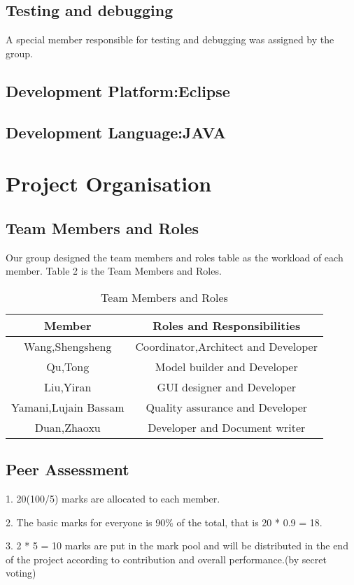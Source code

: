 \documentclass[12pt]{amsart}
\begin{document}
\subsection{Testing and debugging}
A special member responsible for testing and debugging was assigned by the group.

\subsection{Development Platform:Eclipse}
\subsection{Development Language:JAVA}

\section{\textbf{Project Organisation}}
\subsection{\textbf{Team Members and Roles}}
Our group designed the team members and roles table as the workload of each member. Table 2 is the Team Members and Roles.
\begin{table}[h]
\begin{tabular}{ | c | c | }
\hline
Member &  Roles and Responsibilities\\
\hline
Wang,Shengsheng & Coordinator,Architect and Developer\\
\hline
Qu,Tong & Model builder and Developer\\
\hline
Liu,Yiran & GUI designer and Developer\\
\hline
Yamani,Lujain Bassam & Quality assurance and Developer\\
\hline
Duan,Zhaoxu & Developer and Document writer\\
\hline
\end{tabular}
\caption{Team Members and Roles}
\end{table}
\subsection{\textbf{Peer Assessment}}

1. 20(100/5) marks are allocated to each member.

2. The basic marks for everyone is 90$\%$ of the total, that is 20 * 0.9 = 18.

3. 2 * 5 = 10 marks are put in the mark pool and will be distributed in the end of the project according to contribution and overall performance.(by secret voting)
\end{document}
